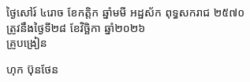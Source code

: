 \documentclass[a4paper,10pt]{article}
\begin{document}
\vspace{20pt}
\hfill
\begin{minipage}{9.8cm}
  {\centering
    ថ្ងៃសៅរ៍ ៤រោច ខែកត្តិក ឆ្នាំមមី អដ្ឋស័ក ពុទ្ធសករាជ ២៥៧០\\[2pt]
    ត្រូវនឹងថ្ងៃទី២៨ ខែវិច្ឆិកា ឆ្នាំ២០២៦\\[3pt]
    {\muol គ្រូបង្រៀន}\par}
  \vspace{44pt}
  \hfill{\muol ហុក ប៊ុនថែន}\hspace*{1.4cm}
\end{minipage}
\end{document}
